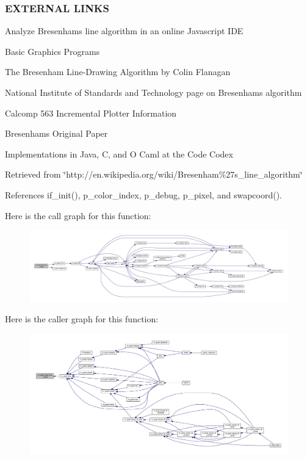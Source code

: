 \subsubsection*{E\+X\+T\+E\+R\+N\+AL L\+I\+N\+KS}


\begin{DoxyItemize}
\item Analyze Bresenham\textquotesingle{}s line algorithm in an online Javascript I\+DE
\item Basic Graphics Programs
\item The Bresenham Line-\/\+Drawing Algorithm by Colin Flanagan
\item National Institute of Standards and Technology page on Bresenham\textquotesingle{}s algorithm
\item Calcomp 563 Incremental Plotter Information
\item Bresenham\textquotesingle{}s Original Paper
\item Implementations in Java, C, and O Caml at the Code Codex
\end{DoxyItemize}

Retrieved from \char`\"{}http\+://en.\+wikipedia.\+org/wiki/\+Bresenham\%27s\+\_\+line\+\_\+algorithm\char`\"{} 

References if\+\_\+init(), p\+\_\+color\+\_\+index, p\+\_\+debug, p\+\_\+pixel, and swapcoord().

Here is the call graph for this function\+:
\nopagebreak
\begin{figure}[H]
\begin{center}
\leavevmode
\includegraphics[width=350pt]{namespacem__pixel_a42791c7e58158616dae7c36ec5806717_cgraph}
\end{center}
\end{figure}
Here is the caller graph for this function\+:
\nopagebreak
\begin{figure}[H]
\begin{center}
\leavevmode
\includegraphics[width=350pt]{namespacem__pixel_a42791c7e58158616dae7c36ec5806717_icgraph}
\end{center}
\end{figure}
\mbox{\label{namespacem__pixel_a58406ffd6c2a9fdf2ea7772198b54255}} 
